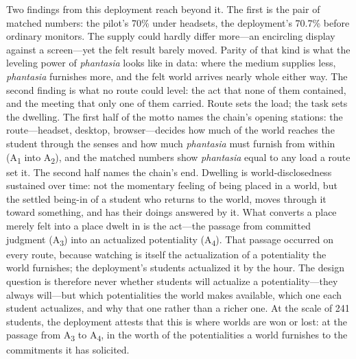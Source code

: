 Two findings from this deployment reach beyond it. The first is the
pair of matched numbers: the pilot's 70\% under headsets, the
deployment's 70.7\% before ordinary monitors. The supply could hardly
differ more---an encircling display against a screen---yet
the felt result barely moved. Parity of that kind is what the leveling
power of \textit{phantasia} looks like in data: where the medium
supplies less, \textit{phantasia} furnishes more, and the felt world
arrives nearly whole either way. The second finding is what no route
could level: the act that none of them contained, and the meeting that
only one of them carried. Route sets the load; the task sets the
dwelling. The first half of the motto names the chain's opening
stations: the route---headset, desktop, browser---decides how much of
the world reaches the student through the senses and how much
\textit{phantasia} must furnish from within (A\textsubscript{1} into
A\textsubscript{2}), and the matched numbers show \textit{phantasia}
equal to any load a route set it. The second half names the chain's
end. Dwelling is world-disclosedness sustained over time: not the
momentary feeling of being placed in a world, but the settled being-in
of a student who returns to the world, moves through it toward
something, and has their doings answered by it. What converts a place
merely felt into a place dwelt in is the act---the passage from
committed judgment (A\textsubscript{3}) into an actualized potentiality
(A\textsubscript{4}). That passage occurred on every route, because
watching is itself the actualization of a potentiality the world
furnishes; the deployment's students actualized it by the hour. The
design question is therefore never whether students will actualize a
potentiality---they always will---but which potentialities the world
makes available, which one each student actualizes, and why that one
rather than a richer one. At the scale of 241 students, the deployment
attests that this is where worlds are won or lost: at the passage from
A\textsubscript{3} to A\textsubscript{4}, in the worth of the
potentialities a world furnishes to the commitments it has solicited.

